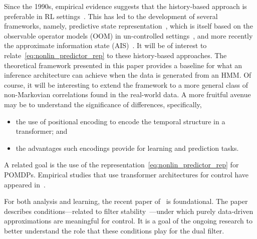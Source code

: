 \documentclass[twoside,11pt]{article}
\begin{document}
Since the 1990s, empirical evidence suggests that the history-based approach is preferable in RL settings~\citep{mccallum1996reinforcement}.  
This has led to the development of several frameworks, namely, predictive state representation~\citep{littman2001predictive,rudary2003nonlinear}, which is itself based on the observable operator models (OOM) in un-controlled settings~\citep{jaeger2000observable}, and more recently the approximate information state (AIS)~\citep{subramanian2022approximate,kao2022common}.
It will be of interest to relate~\eqref{eq:nonlin_predictor_rep} to
these history-based approaches. 
The theoretical framework presented in this paper
provides a baseline for what an inference architecture can achieve when
the data is generated from an HMM. Of course, it will be interesting
to extend the framework to a more general class of non-Markovian
correlations found in the real-world data. A more fruitful avenue may
be to understand the significance of differences, specifically,
\begin{itemize}
\item the use of positional encoding to encode the temporal structure
  in a transformer; and
\item the advantages such encodings provide for learning and
  prediction tasks. 
\end{itemize}
A related goal is the use of the representation~\eqref{eq:nonlin_predictor_rep} for POMDPs. Empirical studies that use transformer architectures for control have appeared in~\cite{chen2021decision,zhang2024decision,guo2024controlagent,ziemann2024state}.

For both analysis and learning, the recent paper of~\cite{yuksel2025another} is foundational.  
The paper describes conditions---related to filter stability~\citep{van2009observability,chigansky2009intrinsic}---under which purely data-driven approximations are meaningful for control.
It is a goal of the ongoing research to better understand the role that these conditions play for the dual filter.

\pagebreak
  
\end{document}
